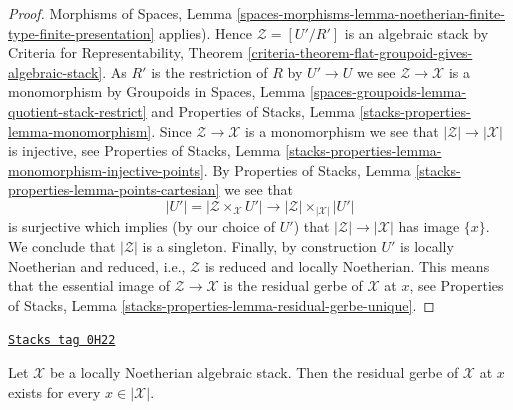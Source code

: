 \begin{proof}
Morphisms of Spaces, Lemma
\ref{spaces-morphisms-lemma-noetherian-finite-type-finite-presentation}
applies). Hence $\mathcal{Z} = [U'/R']$ is an algebraic stack by
Criteria for Representability, Theorem
\ref{criteria-theorem-flat-groupoid-gives-algebraic-stack}.
As $R'$ is the restriction of $R$ by $U' \to U$ we see
$\mathcal{Z} \to \mathcal{X}$ is a monomorphism by
Groupoids in Spaces, Lemma
\ref{spaces-groupoids-lemma-quotient-stack-restrict}
and
Properties of Stacks, Lemma \ref{stacks-properties-lemma-monomorphism}.
Since $\mathcal{Z} \to \mathcal{X}$ is a monomorphism we see that
$|\mathcal{Z}| \to |\mathcal{X}|$ is injective, see
Properties of Stacks, Lemma
\ref{stacks-properties-lemma-monomorphism-injective-points}.
By
Properties of Stacks, Lemma \ref{stacks-properties-lemma-points-cartesian}
we see that
$$
|U'| = |\mathcal{Z} \times_\mathcal{X} U'|
\longrightarrow
|\mathcal{Z}| \times_{|\mathcal{X}|} |U'|
$$
is surjective which implies (by our choice of $U'$) that
$|\mathcal{Z}| \to |\mathcal{X}|$ has image $\{x\}$.
We conclude that $|\mathcal{Z}|$ is a singleton.
Finally, by construction $U'$ is locally Noetherian and reduced, i.e.,
$\mathcal{Z}$ is reduced and locally Noetherian. This means that
the essential image of $\mathcal{Z} \to \mathcal{X}$
is the residual gerbe of $\mathcal{X}$ at $x$, see
Properties of Stacks, Lemma
\ref{stacks-properties-lemma-residual-gerbe-unique}.
\end{proof}

\begin{lemma}
\label{stacks-morphisms-lemma-every-point-residual-gerbe-locally-Noetherian}
\href{https://stacks.math.columbia.edu/tag/0H22}{\texttt{Stacks tag 0H22}}

Let $\mathcal{X}$ be a locally Noetherian algebraic stack.
Then the residual gerbe of $\mathcal{X}$ at $x$ exists for
every $x \in |\mathcal{X}|$.
\end{lemma}

